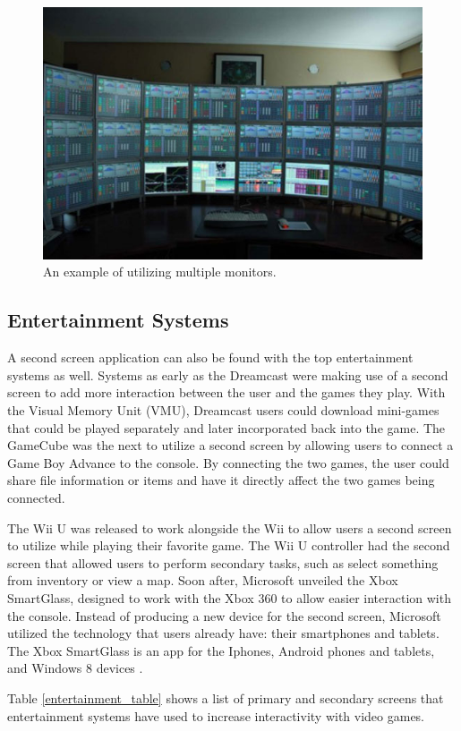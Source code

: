 \documentclass[11pt, oneside]{article}
\begin{document}
\begin{figure}[h!]
    \centering
    \includegraphics[width=.8\textwidth]{Multiple-Monitor-Setup.jpg}
    \caption{An example of utilizing multiple monitors.}
    \label{monitors}
\end{figure}

\subsection{Entertainment Systems}
A second screen application can also be found with the top entertainment systems as well. Systems as early as the Dreamcast were making use of a second screen to add more interaction between the user and the games they play. With the Visual Memory Unit (VMU), Dreamcast users could download mini-games that could be played separately and later incorporated back into the game. The GameCube was the next to utilize a second screen by allowing users to connect a Game Boy Advance to the console. By connecting the two games, the user could share file information or items and have it directly affect the two games being connected.

The Wii U was released to work alongside the Wii to allow users a second screen to utilize while playing their favorite game. The Wii U controller had the second screen that allowed users to perform secondary tasks, such as select something from inventory or view a map. Soon after, Microsoft unveiled the Xbox SmartGlass, designed to work with the Xbox 360 to allow easier interaction with the console. Instead of producing a new device for the second screen, Microsoft utilized the technology that users already have: their smartphones and tablets. The Xbox SmartGlass is an app for the Iphones, Android phones and tablets, and Windows 8 devices \cite{MashableSmartGlass}.

Table \ref{entertainment_table} shows a list of primary and secondary screens that entertainment systems have used to increase interactivity with video games. 
\end{document}
